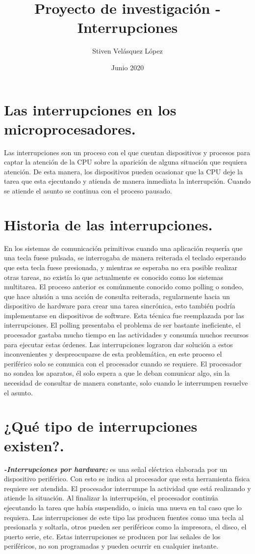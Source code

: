 \documentclass{article}
\title{Proyecto de investigación - Interrupciones}
\author{Stiven Velásquez López }
\date{Junio 2020}
\begin{document}
\maketitle

\section{Las interrupciones en los microprocesadores.} \cite{Eduardo1993}
Las interrupciones son un proceso con el que cuentan dispositivos y procesos para captar la atención de la CPU sobre la aparición de alguna situación que requiera atención. De esta manera, los dispositivos pueden ocasionar que la CPU deje la tarea que esta ejecutando y atienda de manera inmediata la interrupción. Cuando se atiende el asunto se continua con el proceso pausado.

\section{Historia de las interrupciones.}\cite{Jonatan2011}
En los sistemas de comunicación primitivos cuando una aplicación requería que una tecla fuese pulsada, se interrogaba de manera reiterada el teclado esperando que esta tecla fuese presionada, y mientras se esperaba  no era posible realizar otras tareas, no existía lo que actualmente es conocido como los sistemas multitarea. El proceso anterior es comúnmente conocido como polling o sondeo, que hace alusión a una acción de consulta reiterada, regularmente hacia un dispositivo de hardware para crear una tarea sincrónica, esto también podría implementarse en dispositivos de software. Esta técnica fue reemplazada por las interrupciones. El polling presentaba el problema de ser bastante ineficiente, el procesador gastaba mucho tiempo en las actividades y consumía muchos recursos para ejecutar estas órdenes.
Las interrupciones lograron dar solución a estos inconvenientes y despreocuparse de esta problemática, en este proceso el periférico solo se comunica con el procesador cuando se requiere. El procesador no sondea los aparatos, él solo espera a que le deban comunicar algo, sin la necesidad de consultar de manera constante, solo cuando le interrumpen resuelve el asunto. \cite{Marwedel2006}


\section{¿Qué tipo de interrupciones existen?.} \cite{Ramirez1986}

\textbf{\textit{-Interrupciones por hardware:}}  es una señal eléctrica elaborada por un dispositivo periférico. Con esto se indica al procesador que esta herramienta física requiere ser atendida. El procesador interrumpe la actividad que está realizando y atiende la situación. Al finalizar la interrupción, el procesador continúa ejecutando la tarea que había suspendido, o inicia una nueva en tal caso que lo requiera. Las interrupciones de este tipo las producen fuentes como una tecla al presionarla y soltarla, otros pueden ser periféricos como la impresora, el disco, el puerto serie, etc. 
Estas interrupciones se producen por las señales de los periféricos, no son programadas y pueden ocurrir en cualquier instante.
\end{document}
